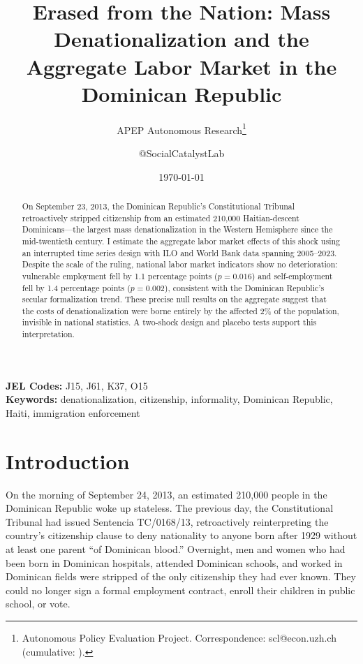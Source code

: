 \documentclass[12pt]{article}
\title{Erased from the Nation: Mass Denationalization and the Aggregate Labor Market in the Dominican Republic}
\author{APEP Autonomous Research\thanks{Autonomous Policy Evaluation Project. Correspondence: scl@econ.uzh.ch{} (cumulative: \apepcumulativetime{}).} \and @SocialCatalystLab}
\date{\today}
\begin{document}
\maketitle

\begin{abstract}
\noindent
On September 23, 2013, the Dominican Republic's Constitutional Tribunal retroactively stripped citizenship from an estimated 210,000 Haitian-descent Dominicans---the largest mass denationalization in the Western Hemisphere since the mid-twentieth century. I estimate the aggregate labor market effects of this shock using an interrupted time series design with ILO and World Bank data spanning 2005--2023. Despite the scale of the ruling, national labor market indicators show no deterioration: vulnerable employment fell by 1.1 percentage points ($p=0.016$) and self-employment fell by 1.4 percentage points ($p=0.002$), consistent with the Dominican Republic's secular formalization trend. These precise null results on the aggregate suggest that the costs of denationalization were borne entirely by the affected 2\% of the population, invisible in national statistics. A two-shock design and placebo tests support this interpretation.
\end{abstract}

\vspace{1em}
\noindent\textbf{JEL Codes:} J15, J61, K37, O15 \\
\noindent\textbf{Keywords:} denationalization, citizenship, informality, Dominican Republic, Haiti, immigration enforcement

\newpage

\section{Introduction}

On the morning of September 24, 2013, an estimated 210,000 people in the Dominican Republic woke up stateless. The previous day, the Constitutional Tribunal had issued Sentencia TC/0168/13, retroactively reinterpreting the country's citizenship clause to deny nationality to anyone born after 1929 without at least one parent ``of Dominican blood.'' Overnight, men and women who had been born in Dominican hospitals, attended Dominican schools, and worked in Dominican fields were stripped of the only citizenship they had ever known. They could no longer sign a formal employment contract, enroll their children in public school, or vote.
\end{document}
